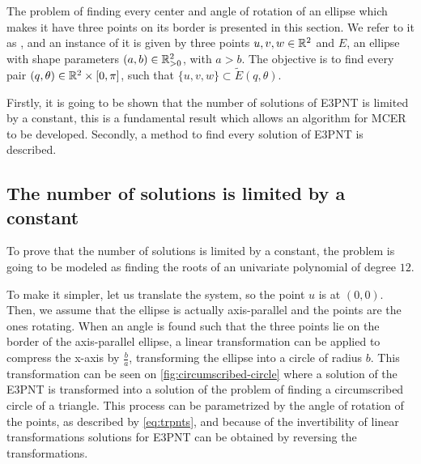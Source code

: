 The problem of finding every center and angle of rotation of an ellipse which makes it have three points on its border is presented in this section. We refer to it as , and an instance of it is given by three points $u, v, w \in \mathbb{R}^2$ and $E$, an ellipse with shape parameters $(a, b) \in \mathbb{R}^2_{>0}$, with $a > b$. The objective is to find every pair $(q, \theta) \in \mathbb{R}^2\times[0, \pi]$, such that $\{u, v, w\} \subset \tilde{E}(q, \theta)$.

Firstly, it is going to be shown that the number of solutions of E3PNT is limited by a constant, this is a fundamental result which allows an algorithm for MCER to be developed. Secondly, a method to find every solution of E3PNT is described.

\subsection{The number of solutions is limited by a constant}

To prove that the number of solutions is limited by a constant, the problem is going to be modeled as finding the roots of an univariate polynomial of degree $12$.

To make it simpler, let us translate the system, so the point $u$ is at $(0,0)$. Then, we assume that the ellipse is actually axis-parallel and the points are the ones rotating. When an angle is found such that the three points lie on the border of the axis-parallel ellipse, a linear transformation can be applied to compress the x-axis by $\frac{b}{a}$, transforming the ellipse into a circle of radius $b$. This transformation can be seen on \autoref{fig:circumscribed-circle} where a solution of the E3PNT is transformed into a solution of the problem of finding a circumscribed circle of a triangle. 
This process can be parametrized by the angle of rotation of the points, as described by \autoref{eq:trpnts}, and because of the invertibility of linear transformations solutions for E3PNT can be obtained by reversing the transformations.

